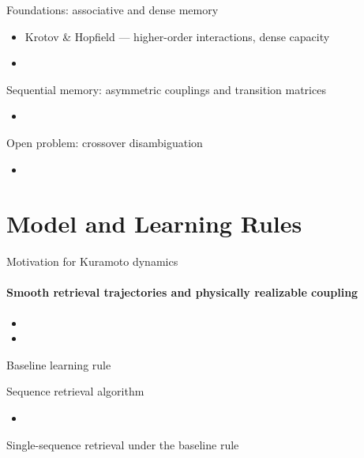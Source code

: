 \documentclass[aspectratio=169]{beamer}
\begin{document}
\begin{frame}{Foundations: associative and dense memory}
  \begin{itemize}
    \item Krotov \& Hopfield --- higher-order interactions, dense capacity
    \item
  \end{itemize}
\end{frame}

\begin{frame}{Sequential memory: asymmetric couplings and transition matrices}
  \begin{itemize}
    \item
  \end{itemize}
\end{frame}

\begin{frame}{Open problem: crossover disambiguation}
  \begin{itemize}
    \item
  \end{itemize}
\end{frame}


\section[Model]{Model and Learning Rules}

\begin{frame}{Motivation for Kuramoto dynamics}
  \framesubtitle{Smooth retrieval trajectories and physically realizable coupling}
  \begin{itemize}
    \item
    \item
  \end{itemize}
\end{frame}

\begin{frame}{Baseline learning rule}
  \[
  \]
\end{frame}

\begin{frame}{Sequence retrieval algorithm}
  \begin{itemize}
    \item
  \end{itemize}
\end{frame}

\begin{frame}{Single-sequence retrieval under the baseline rule}
  \centering
\end{frame}
\end{document}
